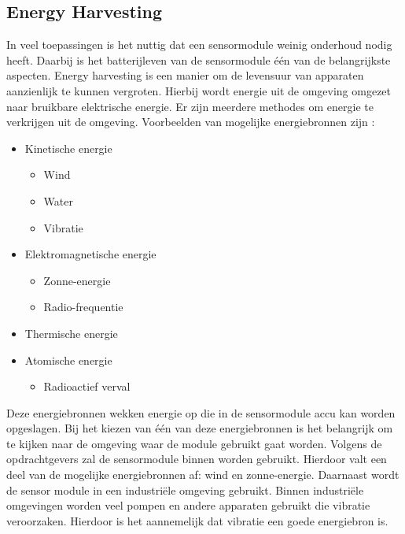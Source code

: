\subsection{Energy Harvesting}
In veel toepassingen is het nuttig dat een sensormodule weinig onderhoud nodig heeft. Daarbij is het batterijleven van de sensormodule één van de belangrijkste aspecten. Energy harvesting is een manier om de levensuur van apparaten aanzienlijk te kunnen vergroten. Hierbij wordt energie uit de omgeving omgezet naar bruikbare elektrische energie. Er zijn meerdere methodes om energie te verkrijgen uit de omgeving. Voorbeelden van mogelijke energiebronnen zijn \cite{energyHarvesting}:
\begin{itemize}
    \item Kinetische energie
    \begin{itemize}
        \item Wind
        \item Water
        \item Vibratie
    \end{itemize}
    \item Elektromagnetische energie
    \begin{itemize}
        \item Zonne-energie
        \item Radio-frequentie
    \end{itemize}
    \item Thermische energie
    \item Atomische energie
    \begin{itemize}
        \item Radioactief verval
    \end{itemize}
\end{itemize}

Deze energiebronnen wekken energie op die in de sensormodule accu kan worden opgeslagen. Bij het kiezen van één van deze energiebronnen is het belangrijk om te kijken naar de omgeving waar de module gebruikt gaat worden. Volgens de opdrachtgevers zal de sensormodule binnen worden gebruikt. Hierdoor valt een deel van de mogelijke energiebronnen af: wind en zonne-energie. Daarnaast wordt de sensor module in een industriële omgeving gebruikt. Binnen industriële omgevingen worden veel pompen en andere apparaten gebruikt die vibratie veroorzaken. Hierdoor is het aannemelijk dat vibratie een goede energiebron is.


